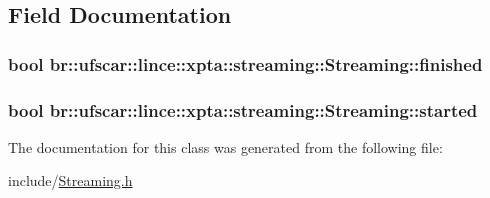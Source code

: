\subsection{Field Documentation}
\hypertarget{classbr_1_1ufscar_1_1lince_1_1xpta_1_1streaming_1_1Streaming_ab6f682aa70a0cf5f960b4a800de06b3c}{
\subsubsection[{finished}]{\setlength{\rightskip}{0pt plus 5cm}bool {\bf br::ufscar::lince::xpta::streaming::Streaming::finished}}}
\label{classbr_1_1ufscar_1_1lince_1_1xpta_1_1streaming_1_1Streaming_ab6f682aa70a0cf5f960b4a800de06b3c}
\hypertarget{classbr_1_1ufscar_1_1lince_1_1xpta_1_1streaming_1_1Streaming_a7713f4c680738c9f1ba0d3f5a114a560}{
\subsubsection[{started}]{\setlength{\rightskip}{0pt plus 5cm}bool {\bf br::ufscar::lince::xpta::streaming::Streaming::started}}}
\label{classbr_1_1ufscar_1_1lince_1_1xpta_1_1streaming_1_1Streaming_a7713f4c680738c9f1ba0d3f5a114a560}


The documentation for this class was generated from the following file:\begin{DoxyCompactItemize}
\item 
include/\hyperlink{Streaming_8h}{Streaming.h}\end{DoxyCompactItemize}
